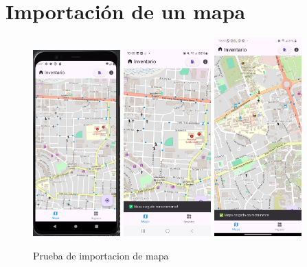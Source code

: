 \section{Importación de un mapa}
\begin{figure}[h]
    \includegraphics[width=0.3\textwidth]{Graphics/Capitulo 4/Pixel 4 [emulador]/4.2/1.png}
    \includegraphics[width=0.3\textwidth]{Graphics/Capitulo 4/Galaxy S23 Ultra Android/4.2/3.jpg}
    \includegraphics[width=0.3\textwidth]{Graphics/Capitulo 4/LG Android 13/4.2/2.png}
    \caption{Prueba de importacion de mapa}
    \label{fig:figura18}
\end{figure}
